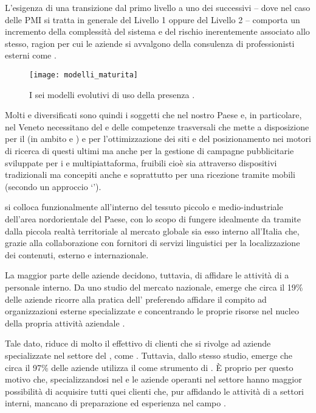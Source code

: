 L'esigenza di una transizione dal primo livello a uno dei successivi -- dove nel caso delle PMI si tratta in generale del Livello 1 oppure del Livello 2 -- comporta un incremento della complessità del sistema e del rischio inerentemente associato allo stesso, ragion per cui le aziende si avvalgono della consulenza di professionisti esterni come \customer.

\begin{figure}[H]
  \centering
  \texttt{[image: modelli\_maturita]}
  \caption{I sei modelli evolutivi di uso della presenza .}
  \label{fig:maturitylevels}
\end{figure}

Molti e diversificati sono quindi i soggetti che nel nostro Paese e, in particolare, nel Veneto necessitano del  e delle competenze trasversali che \customer mette a disposizione per il  \mktg (in ambito  e ) e per l'ottimizzazione dei siti e del posizionamento nei motori di ricerca di questi ultimi ma anche per la gestione di campagne pubblicitarie sviluppate  per i  e multipiattaforma, fruibili cioè sia attraverso dispositivi tradizionali ma concepiti anche e soprattutto per una ricezione tramite  mobili (secondo un approccio `').

\customer si colloca funzionalmente all'interno del tessuto piccolo e medio-industriale dell'area nordorientale del Paese, con lo scopo di fungere idealmente da tramite dalla piccola realtà territoriale al mercato globale sia esso interno all'Italia che, grazie alla collaborazione con fornitori di servizi linguistici per la localizzazione dei contenuti, esterno e internazionale.

La maggior parte delle aziende decidono, tuttavia, di affidare le attività di \mktg a personale interno. Da uno studio del mercato nazionale, emerge che circa il 19\% delle aziende ricorre alla pratica dell' preferendo affidare il compito ad organizzazioni esterne specializzate e concentrando le proprie risorse nel nucleo della propria attività aziendale \cite{picciaiola:indagine}.

Tale dato, riduce di molto il  effettivo di clienti che si rivolge ad aziende specializzate nel settore del \mktg , come \customer .
Tuttavia, dallo stesso studio, emerge che circa il 97\% delle aziende utilizza il  come strumento di \mktg. È  proprio per questo motivo che, specializzandosi nel \mktg {} e  le aziende operanti nel settore hanno maggior possibilità di acquisire tutti quei clienti che, pur affidando le attività di \mktg a settori interni,  mancano di preparazione ed esperienza nel campo .

